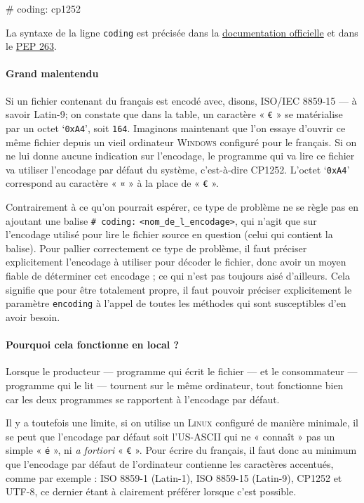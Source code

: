 \begin{nbjupyterin}[before skip=4pt,after skip=6pt]{}
# coding: cp1252
\end{nbjupyterin}

La syntaxe de la ligne \texttt{coding} est précisée dans la \href{https://docs.python.org/3/reference/lexical_analysis.html\#encoding-declarations}{documentation officielle} et dans le \href{https://www.python.org/dev/peps/pep-0263/}{PEP 263}.

\paragraph{Grand malentendu} Si un fichier contenant du français est encodé avec, disons, ISO/IEC 8859-15 --- à savoir Latin-9; on constate que dans la table, un caractère « \texttt{€} » se matérialise par un octet `\texttt{0xA4}', soit \texttt{164}. Imaginons maintenant que l'on essaye d'ouvrir ce même fichier depuis un vieil ordinateur \textsc{Windows} configuré pour le français. Si on ne lui donne aucune indication sur l'encodage, le programme qui va lire ce fichier va utiliser l'encodage par défaut du système, c'est-à-dire CP1252. L'octet `\texttt{0xA4}' correspond au caractère « \texttt{¤} » à la place de « \texttt{€} ».

Contrairement à ce qu'on pourrait espérer, ce type de problème ne se règle pas en ajoutant une balise \texttt{\# coding:} \texttt{<nom\_de\_l\_encodage>}, qui n'agit que sur l'encodage utilisé pour lire le fichier source en question (celui qui contient la balise).
Pour pallier correctement ce type de problème, il faut préciser explicitement l'encodage à utiliser pour décoder le fichier, donc avoir un moyen fiable de déterminer cet encodage ; ce qui n'est pas toujours aisé d'ailleurs. Cela signifie que pour être totalement propre, il faut pouvoir préciser explicitement le paramètre \texttt{encoding} à l'appel de toutes les méthodes qui sont susceptibles d'en avoir besoin.

\paragraph{Pourquoi cela fonctionne en local ?} Lorsque le producteur --- programme qui écrit le fichier --- et le consommateur --- programme qui le lit --- tournent sur le même ordinateur, tout fonctionne bien car les deux programmes se rapportent à l'encodage par défaut.

Il y a toutefois une limite, si on utilise un \textsc{Linux} configuré de manière minimale, il se peut que l'encodage par défaut soit l'US-ASCII qui ne « connaît » pas un simple « \texttt{é} », ni \textit{a fortiori} « \texttt{€} ». Pour écrire du français, il faut donc au minimum que l'encodage par défaut de l'ordinateur contienne les caractères accentués, comme par exemple : ISO 8859-1 (Latin-1), ISO 8859-15 (Latin-9), CP1252 et UTF-8, ce dernier étant à clairement préférer lorsque c'est possible.

